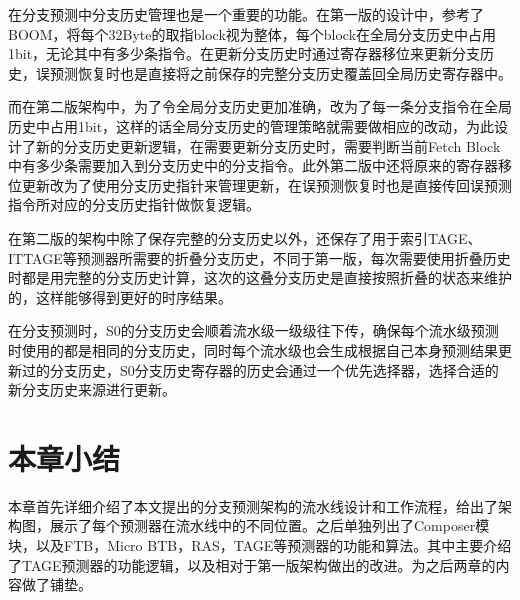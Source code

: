 在分支预测中分支历史管理也是一个重要的功能。在第一版的设计中，参考了BOOM，将每个32Byte的取指block视为整体，每个block在全局分支历史中占用1bit，无论其中有多少条指令。在更新分支历史时通过寄存器移位来更新分支历史，误预测恢复时也是直接将之前保存的完整分支历史覆盖回全局历史寄存器中。

而在第二版架构中，为了令全局分支历史更加准确，改为了每一条分支指令在全局历史中占用1bit，这样的话全局分支历史的管理策略就需要做相应的改动，为此设计了新的分支历史更新逻辑，在需要更新分支历史时，需要判断当前Fetch Block中有多少条需要加入到分支历史中的分支指令。此外第二版中还将原来的寄存器移位更新改为了使用分支历史指针来管理更新，在误预测恢复时也是直接传回误预测指令所对应的分支历史指针做恢复逻辑。

在第二版的架构中除了保存完整的分支历史以外，还保存了用于索引TAGE、ITTAGE等预测器所需要的折叠分支历史，不同于第一版，每次需要使用折叠历史时都是用完整的分支历史计算，这次的这叠分支历史是直接按照折叠的状态来维护的，这样能够得到更好的时序结果。

在分支预测时，S0的分支历史会顺着流水级一级级往下传，确保每个流水级预测时使用的都是相同的分支历史，同时每个流水级也会生成根据自己本身预测结果更新过的分支历史，S0分支历史寄存器的历史会通过一个优先选择器，选择合适的新分支历史来源进行更新。

\section{本章小结}

本章首先详细介绍了本文提出的分支预测架构的流水线设计和工作流程，给出了架构图，展示了每个预测器在流水线中的不同位置。之后单独列出了Composer模块，以及FTB，Micro BTB，RAS，TAGE等预测器的功能和算法。其中主要介绍了TAGE预测器的功能逻辑，以及相对于第一版架构做出的改进。为之后两章的内容做了铺垫。